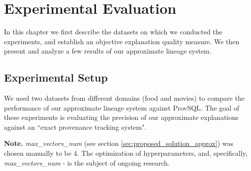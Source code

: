\chapter{Experimental Evaluation}
\label{chap:experimental_evaluation}

In this chapter we first describe the datasets on which we conducted the experiments, and establish an objective explanation quality measure. We then present and analyze a few results of our approximate lineage system.


\section{Experimental Setup}\label{sec:evaluation-setup}
We used two datasets from different domains (food and movies) to compare the performance of our approximate lineage system against ProvSQL. The goal of these experiments is evaluating the precision of our approximate explanations against an ``exact provenance tracking system".
\par\textbf{Note.} \textit{max\_vectors\_num} (see section \ref{sec:proposed_solution_approx}) was chosen manually to be 4. The optimization of hyperparameters, and, specifically, \textit{max\_vectors\_num} - is the subject of ongoing research.\\

